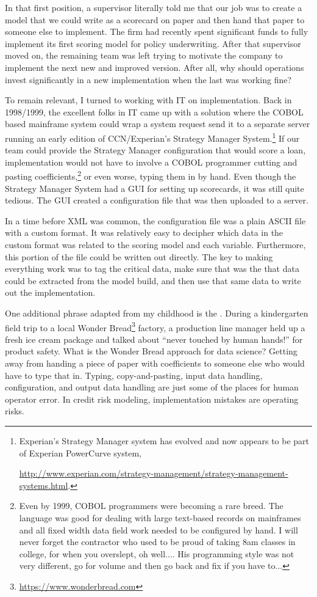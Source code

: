 \documentclass[10pt]{article}
\begin{document}
In that first position, a supervisor literally told me that our job was to create a model that we could write as a scorecard on paper and
then hand that paper to someone else to implement.  The firm had recently spent significant funds to fully implement its first scoring model
for policy underwriting.  After that supervisor moved on, the remaining team was left trying to motivate the company to implement the next
new and improved version.  After all, why should operations invest significantly in a new implementation when the last was working fine?

To remain relevant, I turned to working with IT on implementation.  Back in 1998/1999, the excellent folks in IT came up with a solution
where the COBOL based mainframe system could wrap a system request send it to a separate server running an early edition of CCN/Experian's
Strategy Manager System.\footnote{Experian's Strategy Manager system has evolved and now appears to be part of Experian PowerCurve system,
\par \url{http://www.experian.com/strategy-management/strategy-management-systems.html}.  } If our team could provide the Strategy Manager
configuration that would score a loan, implementation would not have to involve a COBOL programmer cutting and pasting
coefficients,\footnote{Even by 1999, COBOL programmers were becoming a rare breed. The language was good for dealing with large
text-based records on mainframes and all fixed width data field work needed to be configured by hand. I will never forget the contractor
who used to be proud of taking 8am classes in college, for when you overslept, oh well....  His programming style was not very different, 
go for volume and then go back and fix if you have to...} or even
worse, typing them in by hand.  Even though the Strategy Manager System had a GUI for setting up scorecards, it was still quite tedious.
The GUI created a configuration file that was then uploaded to a server. 

In a time before XML was common, the configuration file was a plain ASCII file with a custom format.  It was relatively easy to decipher
which data in the custom format was related to the scoring model and each variable.  Furthermore, this portion of the file could be written out
directly.  The key to making everything work was to tag the critical data, make sure that was the that data could be extracted from
the model build, and then use that same data to write out the implementation.

One additional phrase adapted from my childhood is the .  During a kindergarten field trip to a local Wonder
Bread\footnote{\url{https://www.wonderbread.com}} factory, a production line manager held up a fresh ice cream package and talked about
``never touched by human hands!''  for product safety.  What is the Wonder Bread approach for data science?  Getting away from handing a
piece of paper with coefficients to someone else who would have to type that in.  Typing, copy-and-pasting, input data handling,
configuration, and output data handling are just some of the places for human operator error. In credit risk modeling, implementation
mistakes are operating risks.
\end{document}
